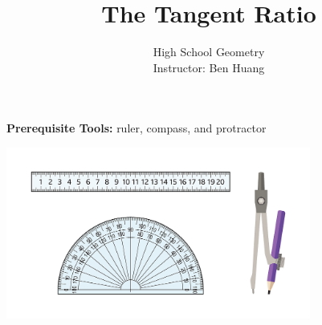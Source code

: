 \documentclass[10pt]{beamer}
\author[B.H.]{{\Large High School Geometry}\\\vspace{.5em} Instructor: Ben Huang}
\date{}
\title[Tangent]{The Tangent Ratio}
\begin{document}
\frame{\titlepage}

\begin{frame}

{\bf Prerequisite Tools:} ruler, compass, and protractor
{
\begin{center}
\includegraphics[width=0.75\textwidth]{geo-tools.png}
\end{center}
}
\end{frame}
\end{document}
